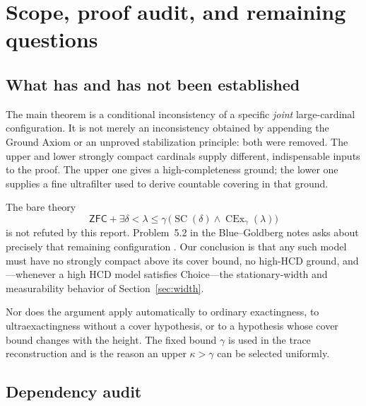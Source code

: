 \documentclass[11pt,letterpaper]{article}
\theoremstyle{definition}
\numberwithin{equation}{section}
\newcommand{\ZFC}{\mathsf{ZFC}}
\newcommand{\HCD}{\mathrm{HCD}}
\newcommand{\SC}{\operatorname{SC}}
\newcommand{\CEx}{\operatorname{CEx}}
\begin{document}
\section{Scope, proof audit, and remaining questions}\label{sec:audit}

\subsection{What has and has not been established}

The main theorem is a conditional inconsistency of a specific
\emph{joint} large-cardinal configuration. It is not merely an
inconsistency obtained by appending the Ground Axiom or an unproved
stabilization principle: both were removed. The upper and lower
strongly compact cardinals supply different, indispensable inputs to
the proof. The upper one gives a high-completeness ground; the lower
one supplies a fine ultrafilter used to derive countable covering in
that ground.

The bare theory
\[
\ZFC+\exists\delta<\lambda\le\gamma\,
\bigl(\SC(\delta)\wedge\CEx_\gamma(\lambda)\bigr)
\]
is not refuted by this report. Problem~5.2 in the Blue--Goldberg notes
asks about precisely that remaining configuration \cite{cover}.
Our conclusion is that any such model must have no strongly compact
above its cover bound, no high-$\HCD$ ground, and---whenever a high
$\HCD$ model satisfies Choice---the stationary-width and measurability
behavior of Section~\ref{sec:width}.

Nor does the argument apply automatically to ordinary exactingness,
to ultraexactingness without a cover hypothesis, or to a hypothesis
whose cover bound changes with the height. The fixed bound $\gamma$
is used in the trace reconstruction and is the reason an upper
$\kappa>\gamma$ can be selected uniformly.

\subsection{Dependency audit}
\end{document}
